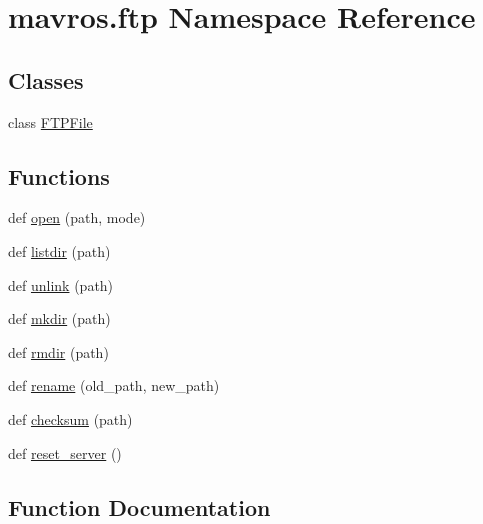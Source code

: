 \hypertarget{namespacemavros_1_1ftp}{}\section{mavros.\+ftp Namespace Reference}
\label{namespacemavros_1_1ftp}
\subsection*{Classes}
\begin{DoxyCompactItemize}
\item 
class \mbox{\hyperlink{classmavros_1_1ftp_1_1FTPFile}{F\+T\+P\+File}}
\end{DoxyCompactItemize}
\subsection*{Functions}
\begin{DoxyCompactItemize}
\item 
def \mbox{\hyperlink{namespacemavros_1_1ftp_a6b481ccf77a4b30ba0213d379bac1cd5}{open}} (path, mode)
\item 
def \mbox{\hyperlink{namespacemavros_1_1ftp_a34a55112263ee6c5e8018c45dc04c1d0}{listdir}} (path)
\item 
def \mbox{\hyperlink{namespacemavros_1_1ftp_aa9c32cf7a3fca4b43a45ca103b9e5a7f}{unlink}} (path)
\item 
def \mbox{\hyperlink{namespacemavros_1_1ftp_a45085a8fdfe2bb00fc86f59e8cce62e6}{mkdir}} (path)
\item 
def \mbox{\hyperlink{namespacemavros_1_1ftp_acb46c43e17c6e1a555fb30f0d39aff17}{rmdir}} (path)
\item 
def \mbox{\hyperlink{namespacemavros_1_1ftp_aefef8b91d7e0f5b543d1c7b4b2680dfe}{rename}} (old\+\_\+path, new\+\_\+path)
\item 
def \mbox{\hyperlink{namespacemavros_1_1ftp_a606b1b5ea6c15cbe1b4f15356706fc8b}{checksum}} (path)
\item 
def \mbox{\hyperlink{namespacemavros_1_1ftp_a58b6c659d54465656c62e9ac5f3ba6e5}{reset\+\_\+server}} ()
\end{DoxyCompactItemize}


\subsection{Function Documentation}
\mbox{\label{namespacemavros_1_1ftp_a606b1b5ea6c15cbe1b4f15356706fc8b}} 
